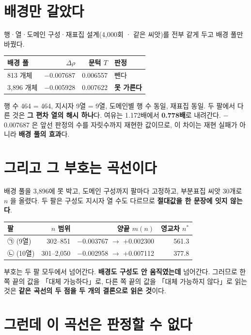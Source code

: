 \documentclass[10pt]{article}
\begin{document}
\section{배경만 갈았다}

행·열·도메인 구성·재표집 설계(4,000회 · 같은 씨앗)를 전부 같게 두고 배경 풀만 바꿨다.

\begin{center}
\begin{tabular}{lrrl}
\hline
배경 풀 & $\Delta\rho$ & 문턱 $T$ & 판정 \\
\hline
813 개체  & $-$0.007687 & 0.006557 & 뺀다 \\
3,896 개체 & $-$0.005928 & 0.007622 & \textbf{못 가른다} \\
\hline
\end{tabular}
\end{center}

행 수 464 = 464, 지시자 9열 = 9열, 도메인별 행 수 동일, 재표집 동일. 두 팔에서 다른
것은 \textbf{그 편차 열의 해시 하나}다. 여유는 1.172배에서 \textbf{0.778배}로 내려간다.
$-$0.007687 은 앞선 판정의 수를 자릿수까지 재현한 값이므로, 이 차이는 재현 실패가
아니라 \textbf{배경 풀의 효과}다.

\section{그리고 그 부호는 곡선이다}

배경 풀을 3,896에 못 박고, 도메인 구성까지 팔마다 고정하고, 부분표집 씨앗 30개로
$n$ 을 올렸다. 두 팔은 구성도 지시자 열 수도 다르므로 \textbf{절대값을 한 문장에 잇지
않는다}.

\begin{center}
\begin{tabular}{lrrr}
\hline
팔 & $n$ 범위 & 양끝 $m(n)$ & 영교차 $n^{*}$ \\
\hline
㉠ (9열)  & 302--851   & $-$0.003767 $\to$ $+$0.002300 & 561.3 \\
㉡ (10열) & 301--2,050 & $-$0.002958 $\to$ $+$0.007112 & 377.8 \\
\hline
\end{tabular}
\end{center}

부호는 두 팔 모두에서 넘어간다. \textbf{배경도 구성도 안 움직였는데} 넘어간다. 그러므로
한쪽 끝의 값을 「대체 가능하다」로, 다른 쪽 끝의 값을 「대체 가능하지 않다」로 읽는 것은
\textbf{같은 곡선의 두 점을 두 개의 결론으로 읽은 것}이다.

\section{그런데 이 곡선은 판정할 수 없다}
\end{document}
